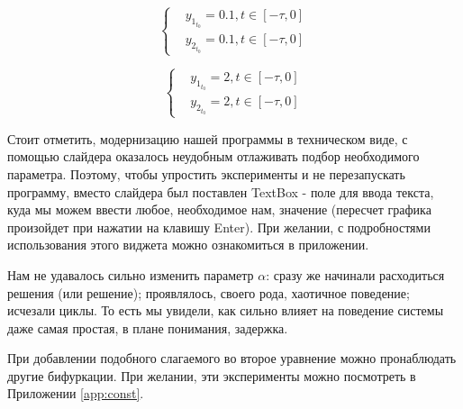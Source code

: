 \begin{equation}\label{lab6:eq4}
  \begin{cases}
    &y_{1_{t_0}} = 0.1, t \in [-\tau, 0]\\
    &y_{2_{t_0}} = 0.1, t \in [-\tau, 0]
  \end{cases}
\end{equation}

\begin{equation}\label{lab6:eq5}
  \begin{cases}
    &y_{1_{t_0}} = 2, t \in [-\tau, 0]\\
    &y_{2_{t_0}} = 2, t \in [-\tau, 0]
  \end{cases}
\end{equation}

Стоит отметить, модернизацию нашей программы в техническом
виде, с помощью слайдера оказалось неудобным отлаживать
подбор необходимого параметра. Поэтому, чтобы упростить
эксперименты и не перезапускать программу, вместо слайдера
был поставлен \textmd{TextBox} - поле для ввода текста, куда мы
можем ввести любое, необходимое нам, значение (пересчет
графика произойдет при нажатии на клавишу \textmd{Enter}).
При желании, с подробностями использования этого виджета
можно ознакомиться в приложении.

\clearpage
{}

Нам не удавалось сильно изменить параметр $\alpha$:
сразу же начинали расходиться решения (или решение);
проявлялось, своего рода, хаотичное поведение; исчезали циклы.
То есть мы увидели, как сильно влияет на поведение системы
даже самая простая, в плане понимания, задержка.

При добавлении подобного слагаемого во второе уравнение можно
пронаблюдать другие бифуркации. При желании, эти эксперименты
можно посмотреть в Приложении \ref{app:const}.
